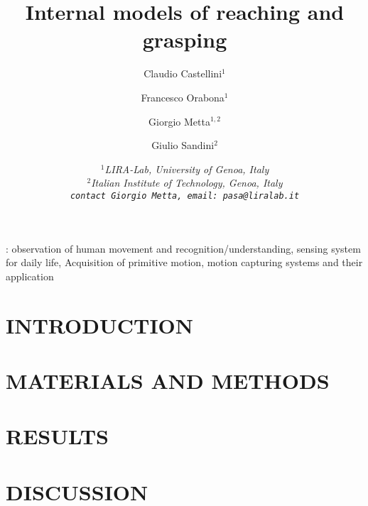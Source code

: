 \documentclass{arsubmit}
\title{Internal models of reaching and grasping}
\author{Claudio Castellini$^1$ \and Francesco Orabona$^1$ \and Giorgio Metta$^{1,2}$ \and Giulio Sandini$^2$}
\date{\small \it{
$^1$LIRA-Lab, University of Genoa, Italy\\
$^2$Italian Institute of Technology, Genoa, Italy\\
{\tt contact Giorgio Metta, email: pasa@liralab.it}
}}
\begin{document}
\maketitle

\begin{abstract}

\end{abstract}

: observation of human movement and
recognition/understanding, sensing system for daily life, Acquisition
of primitive motion, motion capturing systems and their application

\section{INTRODUCTION}
\label{sec:introduction}


\section{MATERIALS AND METHODS}
\label{sec:exp_desc}


\section{RESULTS}
\label{sec:exp_res}


\section{DISCUSSION}
\label{sec:Conclusions}


{\small


}
\end{document}
